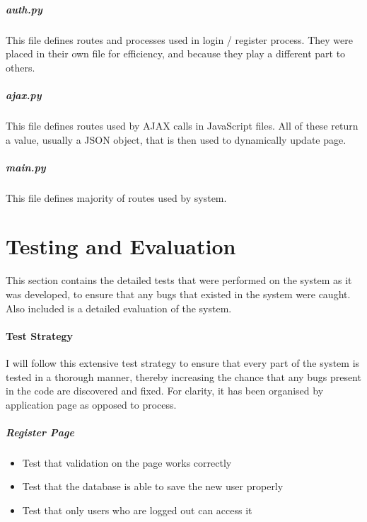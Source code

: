 \documentclass{article}[12pt,a4paper]
\begin{document}
\subsubsection{auth.py}
This file defines routes and processes used in login / register process. They were placed in their own file for efficiency, and because they play a different part to others.


\subsubsection{ajax.py}
This file defines routes used by AJAX calls in JavaScript files. All of these return a value, usually a JSON object, that is then used to dynamically update page.


\subsubsection{main.py}
This file defines majority of routes used by system.


\cleardoublepage


\part{Testing and Evaluation}
This section contains the detailed tests that were performed on the system as it was developed, to ensure that any bugs that existed in the system were caught. Also included is a detailed evaluation of the system.

\subsection{Test Strategy}
I will follow this extensive test strategy to ensure that every part of the system is tested in a thorough manner, thereby increasing the chance that any bugs present in the code are discovered and fixed. For clarity, it has been organised by application page as opposed to process.

\subsubsection{Register Page}
\begin{itemize}
  \item Test that validation on the page works correctly
  \item Test that the database is able to save the new user properly
  \item Test that only users who are logged out can access it
\end{itemize}
\end{document}
